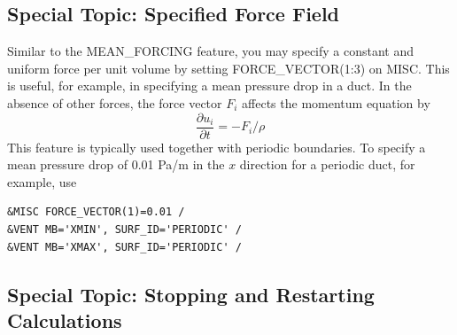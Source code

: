 \documentclass[11pt]{book}
\begin{document}
\subsection{Special Topic: Specified Force Field}
\label{info:force_vector}

Similar to the {\ct MEAN\_FORCING} feature, you may specify a constant and uniform force per unit volume by setting {\ct FORCE\_VECTOR(1:3)} on {\ct MISC}.  This is useful, for example, in specifying a mean pressure drop in a duct.  In the absence of other forces, the force vector $F_i$ affects the momentum equation by
\begin{equation}
\frac{\partial u_i}{\partial t} = -F_i/\rho
\end{equation}
This feature is typically used together with periodic boundaries.  To specify a mean pressure drop of 0.01 Pa/m in the $x$ direction for a periodic duct, for example, use
\begin{lstlisting}
&MISC FORCE_VECTOR(1)=0.01 /
&VENT MB='XMIN', SURF_ID='PERIODIC' /
&VENT MB='XMAX', SURF_ID='PERIODIC' /
\end{lstlisting}

\subsection{Special Topic: Stopping and Restarting Calculations}
\label{info:restart}
\end{document}

